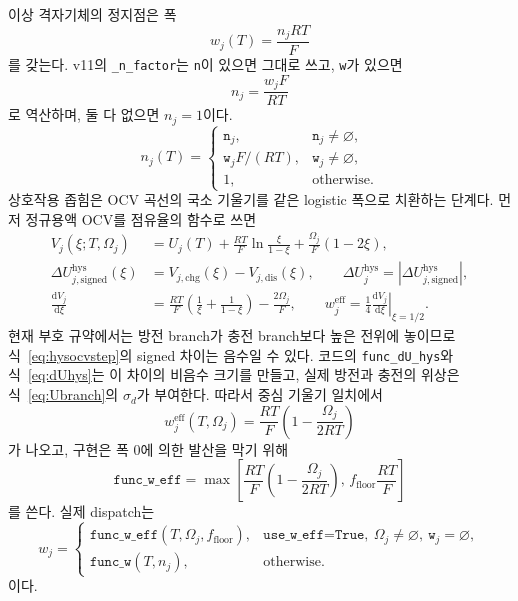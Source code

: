 \documentclass[11pt,a4paper]{article}
\newcommand{\dd}{\mathrm{d}}
\newcommand{\eff}{\mathrm{eff}}
\newcommand{\hys}{\mathrm{hys}}
\newcommand{\dis}{\mathrm{dis}}
\newcommand{\chg}{\mathrm{chg}}
\begin{document}
이상 격자기체의 정지점은 폭
\begin{equation}
\boxed{\;w_j(T)=\frac{n_jRT}{F}\;}
\label{eq:w}
\end{equation}
를 갖는다. v11의 \texttt{\_n\_factor}는 \texttt{n}이 있으면 그대로 쓰고, \texttt{w}가 있으면
\begin{equation}
n_j=\frac{w_jF}{RT}
\label{eq:nfromw}
\end{equation}
로 역산하며, 둘 다 없으면 $n_j=1$이다.
\begin{equation}
n_j(T)=
\begin{cases}
\texttt{n}_j,&\texttt{n}_j\ne\varnothing,\\
\texttt{w}_jF/(RT),&\texttt{w}_j\ne\varnothing,\\
1,&\text{otherwise}.
\end{cases}
\label{eq:nfactor}
\end{equation}
상호작용 좁힘은 OCV 곡선의 국소 기울기를 같은 logistic 폭으로 치환하는 단계다. 먼저 정규용액 OCV를 점유율의 함수로 쓰면
\begin{align}
V_j(\xi;T,\Omega_j)
&=U_j(T)+\frac{RT}{F}\ln\frac{\xi}{1-\xi}
+\frac{\Omega_j}{F}(1-2\xi),\label{eq:ocvregular}\\
\Delta U_{j,\mathrm{signed}}^{\hys}(\xi)
&=V_{j,\chg}(\xi)-V_{j,\dis}(\xi),\qquad
\Delta U_j^{\hys}=\left|\Delta U_{j,\mathrm{signed}}^{\hys}\right|,\label{eq:hysocvstep}\\
\frac{\dd V_j}{\dd \xi}
&=\frac{RT}{F}\left(\frac1{\xi}+\frac1{1-\xi}\right)-\frac{2\Omega_j}{F},\qquad
w_j^{\eff}=\frac14\left.\frac{\dd V_j}{\dd \xi}\right|_{\xi=1/2}.
\label{eq:weffbridge}
\end{align}
현재 부호 규약에서는 방전 branch가 충전 branch보다 높은 전위에 놓이므로 식~\eqref{eq:hysocvstep}의 signed 차이는 음수일 수 있다. 코드의 \texttt{func\_dU\_hys}와 식~\eqref{eq:dUhys}는 이 차이의 비음수 크기를 만들고, 실제 방전과 충전의 위상은 식~\eqref{eq:Ubranch}의 $\sigma_d$가 부여한다. 따라서 중심 기울기 일치에서
\begin{equation}
w_j^{\eff}(T,\Omega_j)=\frac{RT}{F}\left(1-\frac{\Omega_j}{2RT}\right)
\label{eq:weffraw}
\end{equation}
가 나오고, 구현은 폭 0에 의한 발산을 막기 위해
\begin{equation}
\boxed{\;\texttt{func\_w\_eff}=\max\!\left[
\frac{RT}{F}\left(1-\frac{\Omega_j}{2RT}\right),\,
f_{\mathrm{floor}}\frac{RT}{F}\right]\;}
\label{eq:weff}
\end{equation}
를 쓴다. 실제 dispatch는
\begin{equation}
w_j=
\begin{cases}
\texttt{func\_w\_eff}(T,\Omega_j,f_{\mathrm{floor}}),
&\texttt{use\_w\_eff=True},\ \Omega_j\ne\varnothing,\ \texttt{w}_j=\varnothing,\\
\texttt{func\_w}(T,n_j),&\text{otherwise}.
\end{cases}
\label{eq:wdispatch}
\end{equation}
이다.
\end{document}
